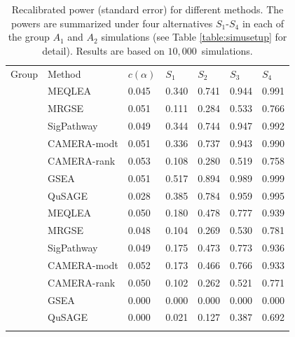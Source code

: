 \documentclass[a4,center,fleqn]{NAR}
\newcommand{\OurMethod}{MEQLEA}
\newcommand{\CMR}{CAMERA-rank}
\newcommand{\CMT}{CAMERA-modt}
\newcommand{\gent}{SigPathway}
\newcommand{\genr}{MRGSE}
\newcommand{\HowmanySimu}{$10,000$}
\begin{document}
	\begin{table}[!ht]
		\centering
		\caption{Recalibrated power (standard error) for different methods. The powers are summarized
			under four alternatives $S_1$-$S_4$ in each of the group $A_1$ and $A_2$ simulations (see Table
			\ref{table:simusetup} for detail). Results are based on \HowmanySimu~simulations.
		}\label{table:power}
		\begin{tabular}{cp{3cm}p{2cm}p{2cm}p{2cm}p{2cm}p{2cm}}
			\toprule
			Group & Method &$c(\alpha)$	& $S_1$ & $S_2$ & $S_3$	&$S_4$  \\ 
			\colrule
			\multirow{7}{*}{$A_1$} & \OurMethod & 0.045 & 0.340 & 0.741 & 0.944 & 0.991 \\ 
			&	\genr  & 0.051 & 0.111 & 0.284 & 0.533 & 0.766 \\ 
			&	\gent & 0.049 & 0.344 & 0.744 & 0.947 & 0.992 \\ 
			&	\CMT  & 0.051 & 0.336 & 0.737 & 0.943 & 0.990 \\ 
			&	\CMR  & 0.053 & 0.108 & 0.280 & 0.519 & 0.758 \\ 
			&	GSEA & 0.051 & 0.517 & 0.894 & 0.989 & 0.999 \\ 
			&	QuSAGE & 0.028 & 0.385 & 0.784 & 0.959 & 0.995 \\ 
		\colrule
			\multirow{7}{*}{$A_2$} &	MEQLEA & 0.050 & 0.180 & 0.478 & 0.777 & 0.939 \\ 
			&		\genr & 0.048 & 0.104 & 0.269 & 0.530 & 0.781 \\ 
			&		\gent & 0.049 & 0.175 & 0.473 & 0.773 & 0.936 \\  
			&		\CMT & 0.052 & 0.173 & 0.466 & 0.766 & 0.933 \\ 
			&		\CMR & 0.050 & 0.102 & 0.262 & 0.521 & 0.771 \\ 
			&		GSEA & 0.000 & 0.000 & 0.000 & 0.000 & 0.000 \\ 
			&		QuSAGE  & 0.000 & 0.021 & 0.127 & 0.387 & 0.692 \\ 
		\botrule
		\end{tabular}
	\end{table}
	
	
	
\end{document}

